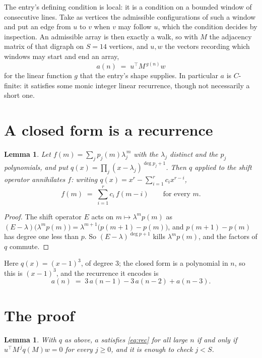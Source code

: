 \documentclass[11pt,a4paper]{article}
\theoremstyle{plain}
\newtheorem{lemma}[theorem]{Lemma}
\theoremstyle{definition}
\begin{document}
The entry's defining condition is local: it is a condition on a bounded window of consecutive lines. Take as vertices the
admissible configurations of such a window and put an edge from $u$ to $v$ when $v$ may
follow $u$, which the condition decides by inspection. An admissible array is then exactly a
walk, so with $M$ the adjacency matrix of that digraph on $S=14$ vertices, and $u,w$ the
vectors recording which windows may start and end an array,
\[
a(n)\;=\;u^{\!\top}M^{\,g(n)}w
\]
for the linear function $g$ that the entry's shape supplies. In particular $a$ is
$C$-finite: it satisfies some monic integer linear recurrence, though not necessarily a short
one.

\section{A closed form is a recurrence}

\begin{lemma}\label{lem:ann}
Let $f(m)=\sum_{j}p_j(m)\lambda_j^{\,m}$ with the $\lambda_j$ distinct and the $p_j$
polynomials, and put $q(x)=\prod_j(x-\lambda_j)^{\deg p_j+1}$. Then $q$ applied to the shift
operator annihilates $f$: writing $q(x)=x^{r}-\sum_{i=1}^{r}c_ix^{r-i}$,
\[
f(m)\;=\;\sum_{i=1}^{r}c_i\,f(m-i)\qquad\text{for every }m.
\]
\end{lemma}

\begin{proof}
The shift operator $E$ acts on $m\mapsto\lambda^{m}p(m)$ as
$(E-\lambda)\bigl(\lambda^{m}p(m)\bigr)=\lambda^{m+1}\bigl(p(m+1)-p(m)\bigr)$, and
$p(m+1)-p(m)$ has degree one less than $p$. So $(E-\lambda)^{\deg p+1}$ kills
$\lambda^{m}p(m)$, and the factors of $q$ commute.
\end{proof}

Here $q(x)=(x-1)^{3}$, of degree $3$; the closed form is a polynomial in $n$, so this is $(x-1)^{3}$, and the recurrence it encodes is
\begin{equation}\label{eq:rec}
a(n)\;=\;3\,a(n-1) - 3\,a(n-2) + a(n-3).
\end{equation}

\section{The proof}

\begin{lemma}\label{lem:crit}
With $q$ as above, $a$ satisfies \eqref{eq:rec} for all large $n$ if and only if
$u^{\!\top}M^{\,j}q(M)w=0$ for every $j\ge0$, and it is enough to check $j<S$.
\end{lemma}
\end{document}
